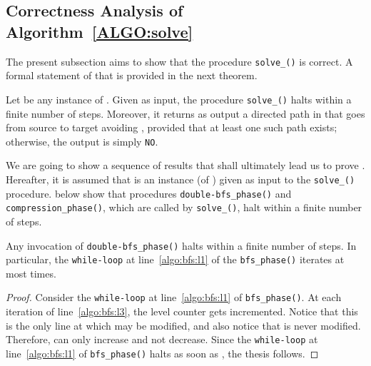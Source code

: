 \subsection{Correctness Analysis of Algorithm~\ref{ALGO:solve}}\label{subsect:correctness}
The present subsection aims to show that the procedure \texttt{solve\_\mainproblem()} is correct.
A formal statement of that is provided in the next theorem.

\begin{theorem}\label{thm:correctness_main}
Let  be any instance of \mainproblem.
Given  as input, the procedure \texttt{solve\_\mainproblem()} halts within a finite number of steps.
Moreover, it returns as output a directed path  in  that goes from source  to target  avoiding ,
provided that at least one such path exists; otherwise, the output is simply \texttt{NO}.
\end{theorem}

We are going to show a sequence of results that shall ultimately lead us to prove .
Hereafter, it is assumed that  is an instance
(of \mainproblem) given as input to the \texttt{solve\_\mainproblem()} procedure.  below show that procedures \texttt{double-bfs\_phase()} and \texttt{compression\_phase()}, which are called by \texttt{solve\_\mainproblem()}, halt within a finite number of steps.

\begin{lemma}\label{lemma:halt_double-bfs}
Any invocation of \texttt{double-bfs\_phase()} halts within a finite number of steps.
In particular, the \texttt{while-loop} at line~\ref{algo:bfs:l1}
of the \texttt{bfs\_phase()} iterates at most  times.
\end{lemma}
\begin{proof}
Consider the \texttt{while-loop} at line~\ref{algo:bfs:l1} of \texttt{bfs\_phase()}.
At each iteration of line~\ref{algo:bfs:l3}, the level counter  gets incremented.
Notice that this is the only line at which  may be modified,
and also notice that  is never modified. Therefore,  can only increase and not decrease.
Since the \texttt{while-loop} at line~\ref{algo:bfs:l1} of \texttt{bfs\_phase()} halts as soon as ,
the thesis follows.
\end{proof}

